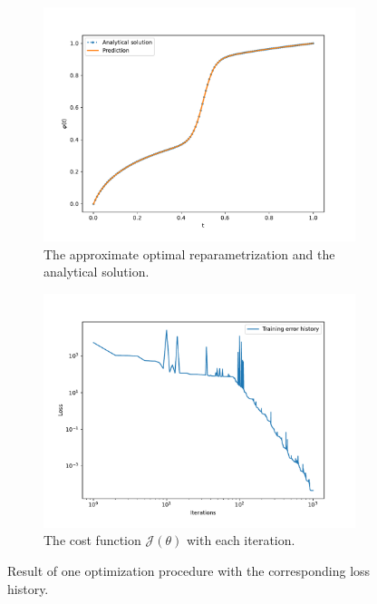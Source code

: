 \begin{figure}[b]
    \begin{subfigure}[t]{0.5\textwidth}
        \centering
        \includegraphics[width=\linewidth]{figures/curve_1/eks_5/plot_2_0.pdf}
        \caption{The approximate optimal reparametrization and the analytical solution.}\label{fig:curve_1_solution}
    \end{subfigure}
    \begin{subfigure}[t]{0.5\textwidth}
        \centering
        \includegraphics[width=\linewidth]{figures/curve_1/eks_5/history_plot_2.pdf}
        \caption{The cost function \(\mathcal{J}(\theta)\) with each iteration.}\label{fig:curve_1_history}
    \end{subfigure}
    \caption{Result of one optimization procedure with the corresponding loss history.}\label{fig:curve_1_example}
\end{figure}


